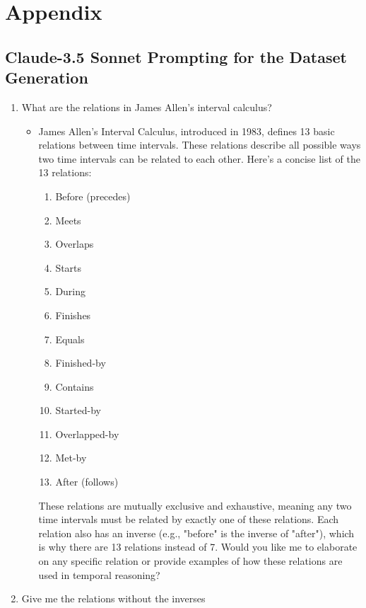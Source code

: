 \documentclass[11pt]{article}
\begin{document}
\appendix
\onecolumn

\section{Appendix}
\subsection{Claude-3.5 Sonnet Prompting for the Dataset Generation}
\label{sec:prompts}
\begin{enumerate}
  \item What are the relations in James Allen's interval calculus?
    \begin{itemize}
      \item James Allen's Interval Calculus, introduced in 1983, defines 13 basic relations between time intervals. These relations describe all possible ways two time intervals can be related to each other. Here's a concise list of the 13 relations:
        \begin{enumerate}
          \item Before (precedes)
          \item Meets
          \item Overlaps
          \item Starts
          \item During
          \item Finishes
          \item Equals
          \item Finished-by
          \item Contains
          \item Started-by
          \item Overlapped-by
          \item Met-by
          \item After (follows)
        \end{enumerate}
These relations are mutually exclusive and exhaustive, meaning any two time intervals must be related by exactly one of these relations. Each relation also has an inverse (e.g., "before" is the inverse of "after"), which is why there are 13 relations instead of 7.
Would you like me to elaborate on any specific relation or provide examples of how these relations are used in temporal reasoning?
    \end{itemize}
  \item Give me the relations without the inverses
    \begin{itemize}

\end{itemize}
\end{enumerate}
\end{document}
